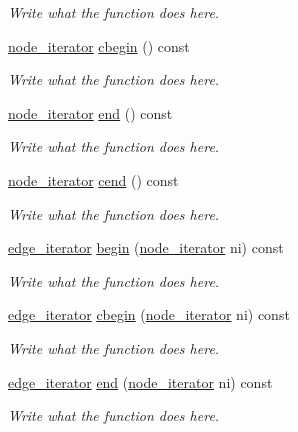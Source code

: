 \begin{DoxyCompactItemize}
\begin{DoxyCompactList}\small\item\em Write what the function does here. \end{DoxyCompactList}\item 
\hyperlink{classgraph_1_1node__iterator}{node\+\_\+iterator} \hyperlink{classgraph_aa4af57bdee2a19b491b3113db848b4a9}{cbegin} () const 
\begin{DoxyCompactList}\small\item\em Write what the function does here. \end{DoxyCompactList}\item 
\hyperlink{classgraph_1_1node__iterator}{node\+\_\+iterator} \hyperlink{classgraph_a4ddb1dc38890533ccb8385909c834b8e}{end} () const 
\begin{DoxyCompactList}\small\item\em Write what the function does here. \end{DoxyCompactList}\item 
\hyperlink{classgraph_1_1node__iterator}{node\+\_\+iterator} \hyperlink{classgraph_ab15637ab99f3448d53c38ecc51d1dcd3}{cend} () const 
\begin{DoxyCompactList}\small\item\em Write what the function does here. \end{DoxyCompactList}\item 
\hyperlink{classgraph_1_1edge__iterator}{edge\+\_\+iterator} \hyperlink{classgraph_a999ee39b5e84843292a3737bdd32739b}{begin} (\hyperlink{classgraph_1_1node__iterator}{node\+\_\+iterator} ni) const 
\begin{DoxyCompactList}\small\item\em Write what the function does here. \end{DoxyCompactList}\item 
\hyperlink{classgraph_1_1edge__iterator}{edge\+\_\+iterator} \hyperlink{classgraph_ac5165defe7702d8c55fdb72ecb5b6444}{cbegin} (\hyperlink{classgraph_1_1node__iterator}{node\+\_\+iterator} ni) const 
\begin{DoxyCompactList}\small\item\em Write what the function does here. \end{DoxyCompactList}\item 
\hyperlink{classgraph_1_1edge__iterator}{edge\+\_\+iterator} \hyperlink{classgraph_ad7837541f30edcae34922ffe4dbbcf7a}{end} (\hyperlink{classgraph_1_1node__iterator}{node\+\_\+iterator} ni) const 
\begin{DoxyCompactList}\small\item\em Write what the function does here. \end{DoxyCompactList}\item 

\end{DoxyCompactItemize}
